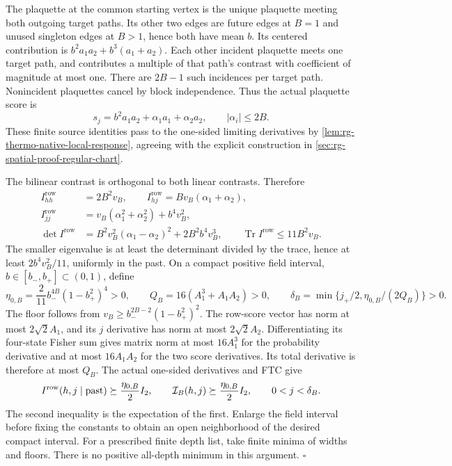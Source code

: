 The plaquette at the common starting vertex is the unique plaquette
meeting both outgoing target paths. Its other two edges are future edges
at \(B=1\) and unused singleton edges at \(B>1\), hence both have mean
\(b\). Its centered contribution is
\(b^2a_1a_2+b^3(a_1+a_2)\). Each other incident plaquette meets one
target path, and contributes a multiple of that path's contrast with
coefficient of magnitude at most one. There are \(2B-1\) such incidences
per target path. Nonincident plaquettes cancel by block independence.
Thus the actual plaquette score is
\begin{equation}
 s_j=b^2a_1a_2+\alpha_1a_1+\alpha_2a_2,
 \qquad |\alpha_i|\le2B.
 \label{eq:rg-thermo-native-product-row-scores}
\end{equation}
These finite source identities pass to the one-sided limiting derivatives
by \cref{lem:rg-thermo-native-local-response}, agreeing with the explicit
construction in \cref{sec:rg-spatial-proof-regular-chart}.

The bilinear contrast is orthogonal to both linear contrasts. Therefore
\begin{equation}
 \begin{split}
 I_{hh}^{\mathrm{row}}&=2B^2v_B,\qquad
 I_{hj}^{\mathrm{row}}=Bv_B(\alpha_1+\alpha_2),\\
 I_{jj}^{\mathrm{row}}&=v_B(\alpha_1^2+\alpha_2^2)+b^4v_B^2,\\
 \det I^{\mathrm{row}}&=B^2v_B^2(\alpha_1-\alpha_2)^2
                                      +2B^2b^4v_B^3,\qquad
 \operatorname{Tr}I^{\mathrm{row}}\le11B^2v_B.
 \end{split}
 \label{eq:rg-thermo-native-product-row-floor}
\end{equation}
The smaller eigenvalue is at least the determinant divided by the trace,
hence at least \(2b^4v_B^2/11\), uniformly in the past. On a compact
positive field interval, \(b\in[b_-,b_+]\subset(0,1)\), define
\begin{equation}
 \eta_{0,B}=\frac2{11}b_-^{4B}(1-b_+^2)^4>0,\qquad
 Q_B=16(A_1^3+A_1A_2)>0,\qquad
 \delta_B=\min\{j_+/2,\eta_{0,B}/(2Q_B)\}>0.
 \label{eq:rg-thermo-native-chart-constants}
\end{equation}
The floor follows from
\(v_B\ge b_-^{2B-2}(1-b_+^2)^2\). The row-score vector has norm at
most \(2\sqrt2 A_1\), and its \(j\) derivative has norm at most
\(2\sqrt2 A_2\). Differentiating its four-state Fisher sum gives matrix
norm at most \(16A_1^3\) for the probability derivative and at most
\(16A_1A_2\) for the two score derivatives. Its total derivative is
therefore at most \(Q_B\). The actual one-sided derivatives and FTC give
\begin{equation}
 I^{\mathrm{row}}(h,j\mid\text{past})\succeq\frac{\eta_{0,B}}2I_2,
 \qquad \mathcal I_B(h,j)\succeq\frac{\eta_{0,B}}2I_2,
 \qquad 0<j<\delta_B.
 \label{eq:rg-thermo-native-positive-chart}
\end{equation}
The second inequality is the expectation of the first. Enlarge the field
interval before fixing the constants to obtain an open neighborhood of
the desired compact interval. For a prescribed finite depth list, take
finite minima of widths and floors. There is no positive all-depth minimum
in this argument. \hfill\(\square\)

